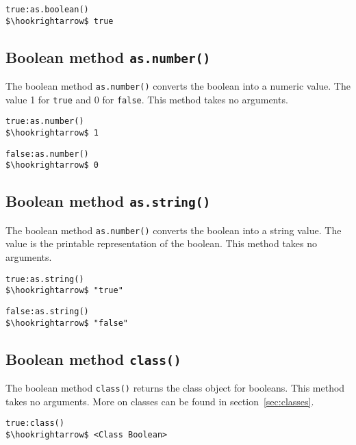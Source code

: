 \documentclass[11pt,a4paper]{scrbook}
\newcommand\keyword[1]{\texttt{#1}}
\newcommand\method[1]{\texttt{#1}}
\begin{document}
\begin{lstlisting}[language=BibTool,mathescape=true]
true:as.boolean()
$\hookrightarrow$ true
\end{lstlisting}

\subsection{Boolean method \method{as.number()}}

The boolean method \method{as.number()} converts the boolean into a numeric
value. The value 1 for \keyword{true} and 0 for \keyword{false}. This method
takes no arguments.

\begin{lstlisting}[language=BibTool,mathescape=true]
true:as.number()
$\hookrightarrow$ 1
\end{lstlisting}

\begin{lstlisting}[language=BibTool,mathescape=true]
false:as.number()
$\hookrightarrow$ 0
\end{lstlisting}

\subsection{Boolean method \method{as.string()}}

The boolean method \method{as.number()} converts the boolean into a string
value. The value is the printable representation of the boolean. This method
takes no arguments.

\begin{lstlisting}[language=BibTool,mathescape=true]
true:as.string()
$\hookrightarrow$ "true"
\end{lstlisting}

\begin{lstlisting}[language=BibTool,mathescape=true]
false:as.string()
$\hookrightarrow$ "false"
\end{lstlisting}

\subsection{Boolean method \method{class()}}

The boolean method \method{class()} returns the class object for booleans.
This method takes no arguments. More on classes can be found in
section~\ref{sec:classes}.

\begin{lstlisting}[language=BibTool,mathescape=true]
true:class()
$\hookrightarrow$ <Class Boolean>
\end{lstlisting}
\end{document}
